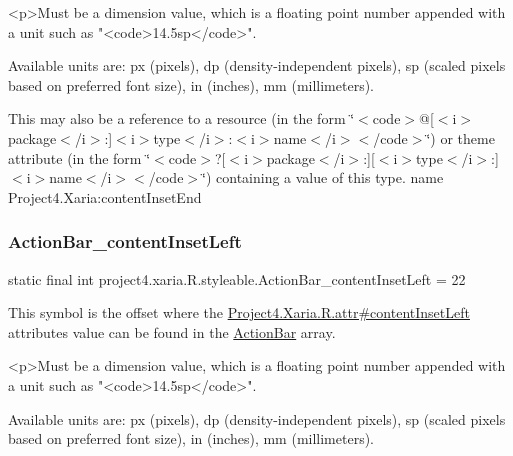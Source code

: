 \begin{DoxyVerb}      <p>Must be a dimension value, which is a floating point number appended with a unit such as "<code>14.5sp</code>".
\end{DoxyVerb}
 Available units are\+: px (pixels), dp (density-\/independent pixels), sp (scaled pixels based on preferred font size), in (inches), mm (millimeters). 

This may also be a reference to a resource (in the form \char`\"{}$<$code$>$@\mbox{[}$<$i$>$package$<$/i$>$\+:\mbox{]}$<$i$>$type$<$/i$>$\+:$<$i$>$name$<$/i$>$$<$/code$>$\char`\"{}) or theme attribute (in the form \char`\"{}$<$code$>$?\mbox{[}$<$i$>$package$<$/i$>$\+:\mbox{]}\mbox{[}$<$i$>$type$<$/i$>$\+:\mbox{]}$<$i$>$name$<$/i$>$$<$/code$>$\char`\"{}) containing a value of this type.  name Project4.\+Xaria\+:content\+Inset\+End \mbox{\label{classproject4_1_1xaria_1_1R_1_1styleable_a1b56e7090c35d8a347e0df70c0835624}} 
\subsubsection{\texorpdfstring{Action\+Bar\+\_\+content\+Inset\+Left}{ActionBar\_contentInsetLeft}}
{\footnotesize\ttfamily static final int project4.\+xaria.\+R.\+styleable.\+Action\+Bar\+\_\+content\+Inset\+Left = 22\hspace{0.3cm}{\ttfamily [static]}}

This symbol is the offset where the \hyperlink{}{Project4.\+Xaria.\+R.\+attr\#content\+Inset\+Left} attribute\textquotesingle{}s value can be found in the \hyperlink{classproject4_1_1xaria_1_1R_1_1styleable_accb530194c58ee3abb15587da8869e99}{Action\+Bar} array.

\begin{DoxyVerb}      <p>Must be a dimension value, which is a floating point number appended with a unit such as "<code>14.5sp</code>".
\end{DoxyVerb}
 Available units are\+: px (pixels), dp (density-\/independent pixels), sp (scaled pixels based on preferred font size), in (inches), mm (millimeters). 

